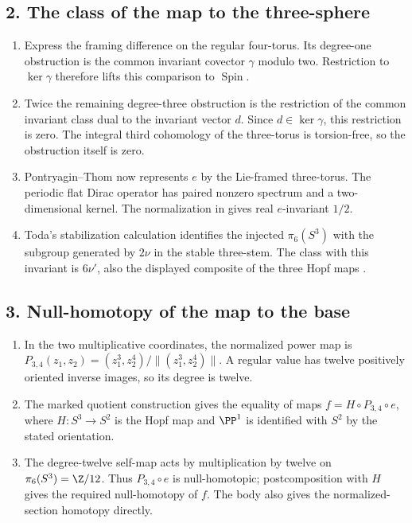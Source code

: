 \subsection*{2. The class of the map to the three-sphere}
\RungOne
\begin{enumerate}[label=\arabic*.,leftmargin=*]
\item Express the framing difference on the regular four-torus.
Its degree-one obstruction is the common invariant covector $\gamma$
modulo two.  Restriction to $\ker\gamma$ therefore lifts this
comparison to $\operatorname{Spin}$.
\item Twice the remaining degree-three obstruction is the restriction
of the common invariant class dual to the invariant vector $d$.
Since $d\in\ker\gamma$, this restriction is zero.  The integral
third cohomology of the three-torus is torsion-free, so the obstruction
itself is zero.
\item Pontryagin--Thom now represents $e$ by the Lie-framed
three-torus.  The periodic flat Dirac operator has paired nonzero
spectrum and a two-dimensional kernel.  The normalization in
\cite[Theorem~4.14, p.~423]{mapsAPS2} gives real $e$-invariant $1/2$.
\item Toda's stabilization calculation identifies the injected
$\pi_6(S^3)$ with the subgroup generated by $2\nu$ in the stable
three-stem.  The class with this invariant is $6\nu'$, also the
displayed composite of the three Hopf maps
\cite[Theorem~4.1 and Corollaries~4.2--4.3]{mapsToda52}.
\end{enumerate}

\subsection*{3. Null-homotopy of the map to the base}
\RungOne
\begin{enumerate}[label=\arabic*.,leftmargin=*]
\item In the two multiplicative coordinates, the normalized power map
is $P_{3,4}(z_1,z_2)=(z_1^3,z_2^4)/\|(z_1^3,z_2^4)\|$.
A regular value has twelve positively oriented inverse images, so its
degree is twelve.
\item The marked quotient construction gives the equality of maps
$f=H\circ P_{3,4}\circ e$, where $H:S^3\to S^2$ is the Hopf
map and $\PP^1$ is identified with $S^2$ by the stated orientation.
\item The degree-twelve self-map acts by multiplication by twelve on
$\pi_6(S^3)=\Z/12$.  Thus $P_{3,4}\circ e$ is null-homotopic;
postcomposition with $H$ gives the required null-homotopy of $f$.
The body also gives the normalized-section homotopy directly.
\end{enumerate}

